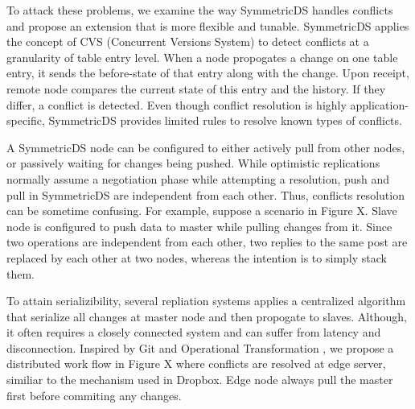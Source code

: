 To attack these problems, we examine the way SymmetricDS handles conflicts and propose an extension that is more flexible and tunable. SymmetricDS applies the concept of CVS (Concurrent Versions System) to detect conflicts at a granularity of table entry level. When a node propogates a change on one table entry, it sends the before-state of that entry along with the change. Upon receipt, remote node compares the current state of this entry and the history. If they differ, a conflict is detected. Even though conflict resolution is highly application-specific, SymmetricDS provides limited rules to resolve known types of conflicts.

A SymmetricDS node can be configured to either actively pull from other nodes, or passively waiting for changes being pushed. While optimistic replications normally assume a negotiation phase while attempting a resolution, push and pull in SymmetricDS are independent from each other. Thus, conflicts resolution can be sometime confusing. For example, suppose a scenario in Figure X. Slave node is configured to push data to master while pulling changes from it. Since two operations are independent from each other, two replies to the same post are replaced by each other at two nodes, whereas the intention is to simply stack them.

To attain serializibility, several repliation systems applies a centralized algorithm that serialize all changes at master node and then propogate to slaves. Although, it often requires a closely connected system and can suffer from latency and disconnection. Inspired by Git\cite{} and Operational Transformation \cite{}, we propose a distributed work flow in Figure X where conflicts are resolved at edge server, similiar to the mechanism used in Dropbox\cite{dropbox}. Edge node always pull the master first before commiting any changes. 

